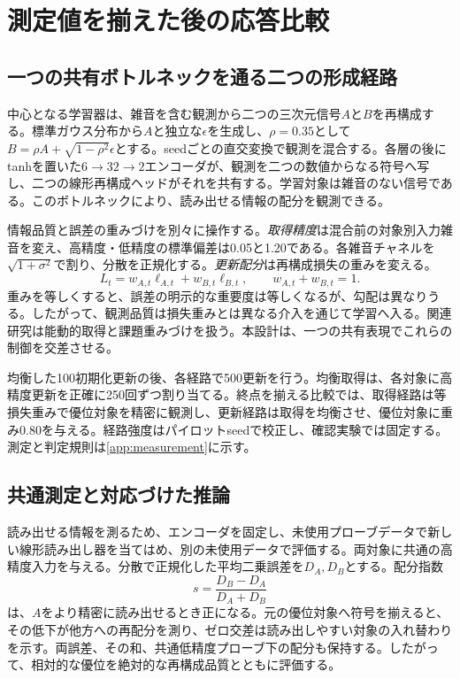 \section{測定値を揃えた後の応答比較}
\label{sec:design}
\subsection{一つの共有ボトルネックを通る二つの形成経路}
中心となる学習器は、雑音を含む観測から二つの三次元信号$A$と$B$を再構成する。標準ガウス分布から$A$と独立な$\epsilon$を生成し、$\rho=0.35$として$B=\rho A+\sqrt{1-\rho^2}\epsilon$とする。seedごとの直交変換で観測を混合する。各層の後にtanhを置いた$6\to32\to2$エンコーダが、観測を二つの数値からなる符号へ写し、二つの線形再構成ヘッドがそれを共有する。学習対象は雑音のない信号である。このボトルネックにより、読み出せる情報の配分を観測できる。

情報品質と誤差の重みづけを別々に操作する。\emph{取得精度}は混合前の対象別入力雑音を変え、高精度・低精度の標準偏差は0.05と1.20である。各雑音チャネルを$\sqrt{1+\sigma^2}$で割り、分散を正規化する。\emph{更新配分}は再構成損失の重みを変える。
\begin{equation}
L_t=w_{A,t}\ell_{A,t}+w_{B,t}\ell_{B,t},\qquad w_{A,t}+w_{B,t}=1.
\label{eq:loss}
\end{equation}
重みを等しくすると、誤差の明示的な重要度は等しくなるが、勾配は異なりうる。したがって、観測品質は損失重みとは異なる介入を通じて学習へ入る。関連研究は能動的取得と課題重みづけを扱う\citep{shim2018joint,chen2022active,chen2018gradnorm,yu2020gradient}。本設計は、一つの共有表現でこれらの制御を交差させる。

均衡した100初期化更新の後、各経路で500更新を行う。均衡取得は、各対象に高精度更新を正確に250回ずつ割り当てる。終点を揃える比較では、取得経路は等損失重みで優位対象を精密に観測し、更新経路は取得を均衡させ、優位対象に重み0.80を与える。経路強度はパイロットseedで校正し、確認実験では固定する。測定と判定規則は\ref{app:measurement}に示す。

\subsection{共通測定と対応づけた推論}
読み出せる情報を測るため、エンコーダを固定し、未使用プローブデータで新しい線形読み出し器を当てはめ、別の未使用データで評価する。両対象に共通の高精度入力を与える。分散で正規化した平均二乗誤差を$D_A,D_B$とする。配分指数
\begin{equation}
s=\frac{D_B-D_A}{D_A+D_B}
\label{eq:s}
\end{equation}
は、$A$をより精密に読み出せるとき正になる。元の優位対象へ符号を揃えると、その低下が他方への再配分を測り、ゼロ交差は読み出しやすい対象の入れ替わりを示す。両誤差、その和、共通低精度プローブ下の配分も保持する。したがって、相対的な優位を絶対的な再構成品質とともに評価する。

